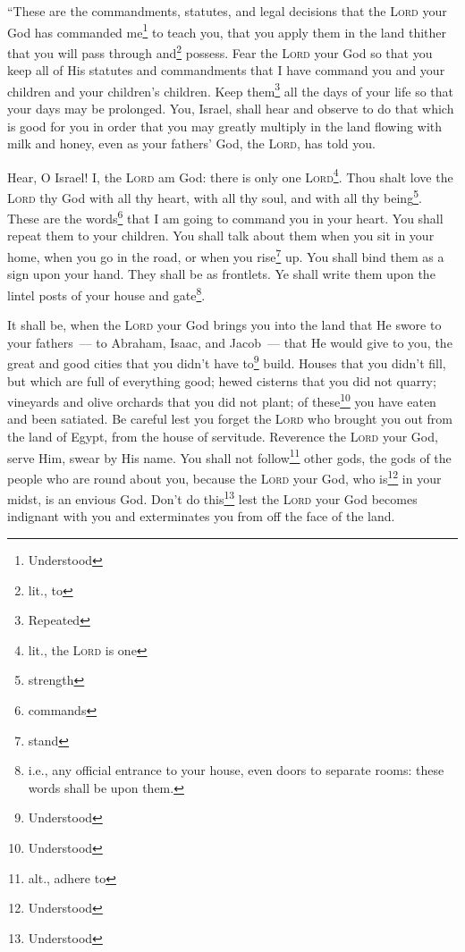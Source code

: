 
\begin{inparaenum}
     ``These are the commandments, statutes, and legal decisions that the \textsc{Lord} your God has commanded me\footnote{Understood} to teach you, that you apply them in the land thither that you will pass through and\footnote{lit., to} possess.%
     Fear the \textsc{Lord} your God so that you keep all of His statutes and commandments that I have command you and your children and your children's children. Keep them\footnote{Repeated} all the days of your life so that your days may be prolonged.%
     You, Israel, shall hear and observe to do that which is good for you in order that you may greatly multiply in the land flowing with milk and honey, even as your fathers' God, the \textsc{Lord}, has told you.%
    
     Hear, O Israel! I, the \textsc{Lord} am God: there is only one \textsc{Lord}\footnote{lit., the \textsc{Lord} is one}.%
     Thou shalt love the \textsc{Lord} thy God with all thy heart, with all thy soul, and with all thy being\footnote{strength}.%
     These are the words\footnote{commands} that I am going to command you in your heart.%
     You shall repeat them to your children. You shall talk about them when you sit in your home, when you go in the road, or when you rise\footnote{stand} up.%
     You shall bind them as a sign upon your hand. They shall be as frontlets.%
     Ye shall write them upon the lintel posts of your house and gate\footnote{i.e., any official entrance to your house, even doors to separate rooms: these words shall be upon them.}.%
    
     It shall be, when the \textsc{Lord} your God brings you into the land that He swore to your fathers~--- to Abraham, Isaac, and Jacob~--- that He would give to you, the great and good cities that you didn't have to\footnote{Understood} build.%
     Houses that you didn't fill, but which are full of everything good; hewed cisterns that you did not quarry; vineyards and olive orchards that you did not plant; of these\footnote{Understood} you have eaten and been satiated.%
     Be careful lest you forget the \textsc{Lord} who brought you out from the land of Egypt, from the house of servitude.%
     Reverence the \textsc{Lord} your God, serve Him, swear by His name.%
     You shall not follow\footnote{alt., adhere to} other gods, the gods of the people who are round about you,%
     because the \textsc{Lord} your God, who is\footnote{Understood} in your midst, is an envious God. Don't do this\footnote{Understood} lest the \textsc{Lord} your God becomes indignant with you and exterminates you from off the face of the land.%
    

\end{inparaenum}
